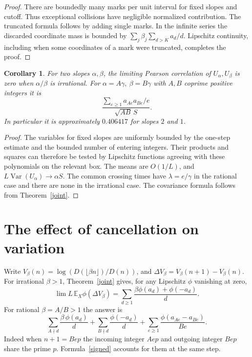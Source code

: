 \documentclass[10pt]{article}
\newtheorem{corollary}[theorem]{Corollary}
\newcommand{\EE}{\mathbb E_X}
\begin{document}
\begin{proof}
There are boundedly many marks per unit interval for fixed slopes and cutoff. Thus exceptional collisions have negligible normalized contribution. The truncated formula follows by adding single marks. In the infinite series the discarded coordinate mass is bounded by $\sum_j\beta_j\sum_{d>K}a_d/d$. Lipschitz continuity, including when some coordinates of a mark were truncated, completes the proof.
\end{proof}

\begin{corollary}\label{corr}
For two slopes $\alpha,\beta$, the limiting Pearson correlation of $U_\alpha,U_\beta$ is zero when $\alpha/\beta$ is irrational. For $\alpha=A\gamma,\ \beta=B\gamma$ with $A,B$ coprime positive integers it is
\[
 \frac{\sum_{e\ge1}a_{Ae}a_{Be}/e}{\sqrt{AB}\, S}.
\]
In particular it is approximately $0.406417$ for slopes $2$ and $1$.
\end{corollary}
\begin{proof}
The variables for fixed slopes are uniformly bounded by the one-step estimate and the bounded number of entering integers. Their products and squares can therefore be tested by Lipschitz functions agreeing with these polynomials on the relevant box. The means are $O(1/L)$, and $L\operatorname{Var}(U_\alpha)\to\alpha S$. The common crossing times have $\lambda=e/\gamma$ in the rational case and there are none in the irrational case. The covariance formula follows from Theorem~\ref{joint}.
\end{proof}

\section{The effect of cancellation on variation}
Write $V_\beta(n)=\log(D(\lfloor\beta n\rfloor)/D(n))$, and $\Delta V_\beta=V_\beta(n+1)-V_\beta(n)$. For irrational $\beta>1$, Theorem~\ref{joint} gives, for any Lipschitz $\phi$ vanishing at zero,
\[
 \lim L\,\EE\phi(\Delta V_\beta)=
 \sum_{d\ge1}\frac{\beta\phi(a_d)+\phi(-a_d)}d.
\]
For rational $\beta=A/B>1$ the answer is
\begin{equation}\label{signed}
 \sum_{A\nmid d}\frac{\beta\,\phi(a_d)}d+
 \sum_{B\nmid d}\frac{\phi(-a_d)}d+
 \sum_{e\ge1}\frac{\phi(a_{Ae}-a_{Be})}{Be}.
\end{equation}
Indeed when $n+1=Be p$ the incoming integer $Ae p$ and outgoing integer $Be p$ share the prime $p$. Formula~\eqref{signed} accounts for them at the same step.
\end{document}

